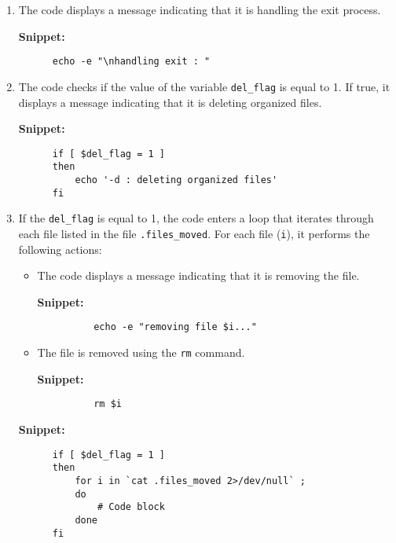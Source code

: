 \documentclass[12pt]{article}
\begin{document}
    \begin{enumerate}
      \item The code displays a message indicating that it is handling the exit process.
      
      \textbf{Snippet:}
      \begin{verbatim}
      echo -e "\nhandling exit : "
      \end{verbatim}
      
      \item The code checks if the value of the variable \texttt{del\_flag} is equal to 1. If true, it displays a message indicating that it is deleting organized files.
      
      \textbf{Snippet:}
      \begin{verbatim}
      if [ $del_flag = 1 ]
      then
          echo '-d : deleting organized files'
      fi
      \end{verbatim}
      
      \item If the \texttt{del\_flag} is equal to 1, the code enters a loop that iterates through each file listed in the file \texttt{.files\_moved}. For each file (\texttt{i}), it performs the following actions:
        \begin{itemize}
          \item The code displays a message indicating that it is removing the file.
          
          \textbf{Snippet:}
          \begin{verbatim}
          echo -e "removing file $i..."
          \end{verbatim}
          
          \item The file is removed using the \texttt{rm} command.
          
          \textbf{Snippet:}
          \begin{verbatim}
          rm $i
          \end{verbatim}
        \end{itemize}
        
      \textbf{Snippet:}
      \begin{verbatim}
      if [ $del_flag = 1 ]
      then
          for i in `cat .files_moved 2>/dev/null` ;
          do
              # Code block
          done
      fi
      \end{verbatim}
    \end{enumerate}
    
\end{document}
